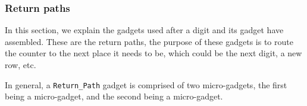 

\subsubsection{ Return paths}
In this section, we explain the gadgets used after a digit and its {\dtop} gadget have assembled. These
are the return paths, the purpose of these gadgets is to route the counter to the next place it needs to be, which
could be the next digit, a new row, etc.

In general, a {\tt Return\_Path} gadget is comprised of two micro-gadgets, the first being a {\returnfromdigit} micro-gadget, and
the second being a {\readnext} micro-gadget.


\begin{figure}[H]
    \centering
    \begin{subfigure}[t]{0.24\textwidth}
        \centering

\end{subfigure}
\end{figure}
